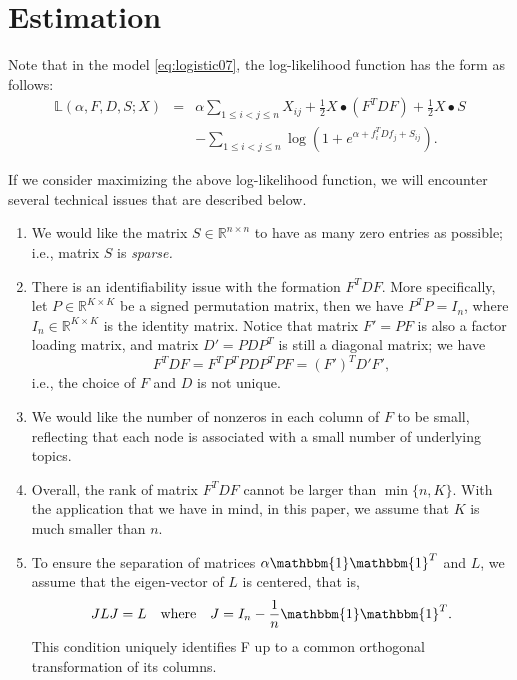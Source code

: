 \documentclass[AMS,STIX1COL]{WileyNJD-v2}
\begin{document}
\section{Estimation}
\label{sec:estimate}


Note that in the model \eqref{eq:logistic07}, the log-likelihood function has the form as follows:
\begin{eqnarray}
\label{eq:logistic08}
\mathbb{L}(\alpha,  F, D, S; X)
&=& \alpha \sum_{1\le i< j\le n}X_{ij} +\frac{1}{2} X \bullet (F^T D F) +\frac{1}{2} X \bullet S \\
&& -\sum_{1\le i<j\le n} \log \left(1 + e^{\alpha + f_i^T D f_j +S_{ij} }\right). \nonumber
\end{eqnarray}

If we consider maximizing the above log-likelihood function,
we will encounter several technical issues that are described below.
\begin{enumerate}
\item We would like the matrix $S \in \mathbb{R}^{n \times n}$ to have as many zero entries as possible; i.e., matrix $S$ is {\it sparse.}

\item There is an identifiability issue with the formation $F^T D F$.
More specifically, let $P \in \mathbb{R}^{K \times K}$ be a signed permutation matrix, then we have $P^T P = I_n$, where $I_n \in \mathbb{R}^{K \times K}$ is the identity matrix.
Notice that matrix $F' = PF$ is also a factor loading matrix, and
matrix $D' = P D P^T$ is still a diagonal matrix;
we have
$$
F^T D F = F^T P^T P D P^T P F = (F')^T D' F',
$$
i.e., the choice of $F$ and $D$ is not unique.

\item We would like the number of nonzeros in each column of $F$ to be small, reflecting that each node is associated with a small number of underlying topics.

\item Overall, the rank of matrix $F^T D F$ cannot be larger than $\min\{n,K\}$.
With the application that we have in mind, in this paper, we assume that $K$ is much smaller than $n$.

\item To ensure the separation of matrices $\alpha\mathbbm{1}\mathbbm{1}^T$ and $L$, we assume that the eigen-vector of $L$ is centered, that is,
\[
    JLJ = L \quad \mbox{where} \quad
    J=I_{n}-\frac{1}{n}\mathbbm{1}\mathbbm{1}^T.
\]
This condition uniquely identifies F up to a common orthogonal transformation of its columns.

\end{enumerate}
\end{document}
